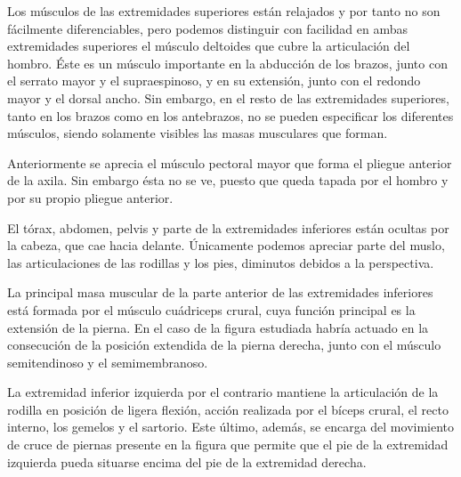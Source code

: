 Los músculos de las extremidades superiores están relajados y por tanto no son fácilmente diferenciables, pero podemos distinguir con facilidad en ambas extremidades superiores el músculo deltoides que cubre la articulación del hombro. Éste es un músculo importante en la abducción de los brazos, junto con el serrato mayor y el supraespinoso, y en su extensión, junto con el redondo mayor y el dorsal ancho. Sin embargo, en el resto de las extremidades superiores, tanto en los brazos como en los antebrazos, no se pueden especificar los diferentes músculos, siendo solamente visibles las masas musculares que forman.

Anteriormente se aprecia el músculo pectoral mayor que forma el pliegue anterior de la axila. Sin embargo ésta no se ve, puesto que queda tapada por el hombro y por su propio pliegue anterior.

El tórax, abdomen, pelvis y parte de la extremidades inferiores están ocultas por la cabeza, que cae hacia delante. Únicamente podemos apreciar parte del muslo, las articulaciones de las rodillas y los pies, diminutos debidos a la perspectiva.

La principal masa muscular de la parte anterior de las extremidades inferiores está formada por el músculo cuádriceps crural, cuya función principal es la extensión de la pierna. En el caso de la figura estudiada habría actuado en la consecución de la posición extendida de la pierna derecha, junto con el músculo semitendinoso y el semimembranoso.

La extremidad inferior izquierda por el contrario mantiene la articulación de la rodilla en posición de ligera flexión, acción realizada por el bíceps crural, el recto interno, los gemelos y el sartorio. Este último, además, se encarga del movimiento de cruce de piernas presente en la figura que permite que el pie de la extremidad izquierda pueda situarse encima del pie de la extremidad derecha.





